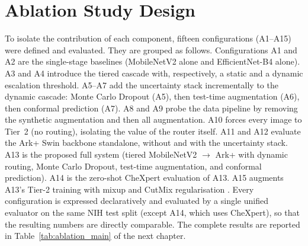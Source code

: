 \section{Ablation Study Design}
\label{sec:ablation_design}
To isolate the contribution of each component, fifteen configurations (A1--A15) were defined and evaluated. They are grouped as follows. Configurations A1 and A2 are the single-stage baselines (MobileNetV2 alone and EfficientNet-B4 alone). A3 and A4 introduce the tiered cascade with, respectively, a static and a dynamic escalation threshold. A5--A7 add the uncertainty stack incrementally to the dynamic cascade: Monte Carlo Dropout (A5), then test-time augmentation (A6), then conformal prediction (A7). A8 and A9 probe the data pipeline by removing the synthetic augmentation and then all augmentation. A10 forces every image to Tier~2 (no routing), isolating the value of the router itself. A11 and A12 evaluate the Ark+ Swin backbone standalone, without and with the uncertainty stack. A13 is the proposed full system (tiered MobileNetV2 $\rightarrow$ Ark+ with dynamic routing, Monte Carlo Dropout, test-time augmentation, and conformal prediction). A14 is the zero-shot CheXpert evaluation of A13. A15 augments A13's Tier-2 training with mixup and CutMix regularisation \cite{zhang2018mixup, yun2019cutmix}. Every configuration is expressed declaratively and evaluated by a single unified evaluator on the same NIH test split (except A14, which uses CheXpert), so that the resulting numbers are directly comparable. The complete results are reported in Table~\ref{tab:ablation_main} of the next chapter.
